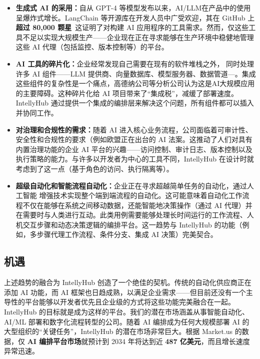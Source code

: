 \documentclass[11点, A4纸, 单面]{article}
\begin{document}
\begin{itemize}
    \item \textbf{生成式 AI 的采用：}自从 GPT-4 等模型发布以来，AI/LLM在产品中的使用呈爆炸式增长。LangChain 等开源库在开发人员中广受欢迎，其在 GitHub 上 \textbf{超过 80,000 颗星}~\cite{langchainGitHub}这证明了对构建 AI 应用程序的工具需求。然而，仅这些工具不足以实现大规模生产——企业现在正在寻求能够在生产环境中稳健地管理这些 AI 代理（包括监控、版本控制等）的平台。

    \item \textbf{AI 工具的碎片化：}企业经常发现自己需要在现有的软件堆栈之外， 同时处理许多 AI 组件——LLM 提供商、向量数据库、模型服务器、数据管道—。集成这些组件的复杂性是一个痛点，高德纳公司等分析公司认为这是AI大规模应用的主要障碍\cite{gartnerAIBarriers}。这种碎片化给 AI 项目带来了“集成税”，减缓了部署速度。IntellyHub 通过提供一个集成的编排层来解决这个问题，所有组件都可以插入并协同工作。

    \item \textbf{对治理和合规性的需求：}随着 AI 进入核心业务流程，公司面临着可审计性、安全性和合规性的要求（例如欧盟正在出台的 AI 法案\cite{euAIAct}。这推动了人们对具有内置治理功能的企业 AI 平台的兴趣——访问控制、审计日志、版本控制以及执行策略的能力。与许多以开发者为中心的工具不同，IntellyHub 在设计时就考虑到了这一点（基于角色的访问、执行隔离等）。

    \item \textbf{超级自动化和智能流程自动化：}企业正在寻求超越简单任务的自动化，通过人工智能 增强技术实现整个端到端流程的自动化。这可能意味着自动化工作流程不仅在能够在系统之间移动数据，还能智能地决策操作（通过 AI 代理）并在需要时与人类进行互动。此类用例需要能够处理长时间运行的工作流程、人机交互步骤和动态决策逻辑的编排平台。这一趋势与 IntellyHub 的功能（例如，多步骤代理工作流程、条件分支、集成 AI 决策）完美契合。
\end{itemize}

\subsection{机遇}

上述趋势的融合为 IntellyHub 创造了一个绝佳的契机。传统的自动化供应商正在添加 AI 功能，而 AI 框架也日趋成熟，以满足企业需求——但目前还没有一个主导性的平台能够以开发者优先且企业级的方式将这些功能完美融合在一起。IntellyHub 的目标就是成为这样的平台。我们的潜在市场涵盖从事智能自动化、AI/ML 部署和数字化流程转型的公司。随着 AI 编排成为任何大规模部署 AI 的大型组织的“关键任务”，IntellyHub 的潜在市场非常巨大。根据 Market.us 的数据，仅 \textbf{AI 编排平台市场}就预计到 2034 年将达到近 \textbf{487 亿美元}\cite{AIOrch}，而且增长速度异常迅速。
\end{document}
